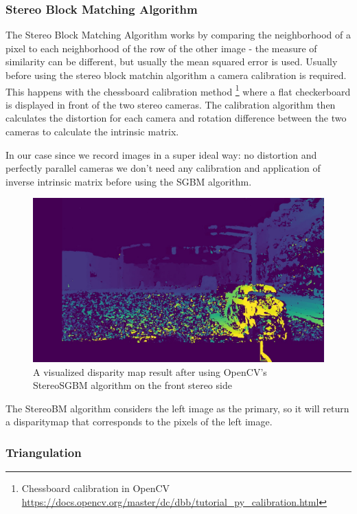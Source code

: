 \subsubsection{Stereo Block Matching Algorithm}
The Stereo Block Matching Algorithm works by comparing the neighborhood of a
pixel to each neighborhood of the row of the other image - the measure of
similarity can be different, but usually the mean squared error is used. Usually
before using the stereo block matchin algorithm a camera calibration is
required. This happens with the chessboard calibration method
\footnote{Chessboard calibration in OpenCV \url{https://docs.opencv.org/master/dc/dbb/tutorial_py_calibration.html}}
 where a flat checkerboard is displayed in front of the two stereo cameras. The
 calibration algorithm then calculates the distortion for each camera and
 rotation difference between the two cameras to calculate the intrinsic matrix.

 In our case since we record images in a super ideal way: no distortion and
 perfectly parallel cameras we don't need any calibration and application of
 inverse intrinsic matrix before using the SGBM algorithm.

\begin{figure}[!ht]
    \centering
    \includegraphics[width=150mm, keepaspectratio]{figures/335DP.jpg}
    \caption{A visualized disparity map result after using OpenCV's StereoSGBM algorithm on the front stereo side}
    \label{fig:disparitymap}
\end{figure}

The StereoBM algorithm considers the left image as the primary, so it will
return a disparitymap that corresponds to the pixels of the left image.

\subsubsection{Triangulation}

